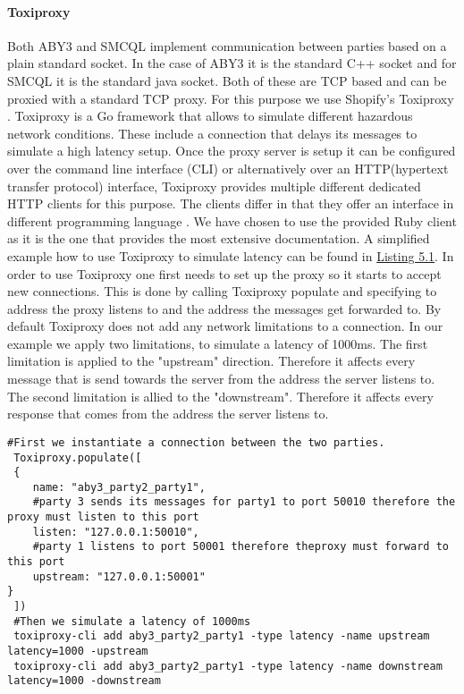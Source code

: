  \paragraph{Toxiproxy}
 Both ABY3 and SMCQL implement communication between parties based on a plain standard socket. In the case of ABY3 it is the standard C++ socket and for SMCQL it is the standard java socket. Both of these are TCP based and can be proxied with a standard TCP proxy. For this purpose we use Shopify's Toxiproxy \cite{toxiproxy}. Toxiproxy is a Go framework that allows to simulate different hazardous network conditions. These include a connection that delays its messages to simulate a high latency setup. Once the proxy server is setup it can be configured over the command line interface (CLI) or alternatively over an HTTP(hypertext transfer protocol) interface, Toxiproxy provides multiple different dedicated HTTP clients for this purpose. The clients differ in that they offer an interface in different programming language . We have chosen to use the provided Ruby client as it is the one that provides the most extensive documentation. 
 A simplified example how to use Toxiproxy to simulate latency can be found in \hyperref[the_label]{Listing 5.1}. In order to use Toxiproxy one first needs to set up the proxy so it starts to accept new connections. This is done by calling Toxiproxy populate and specifying to address the proxy listens to and the address the messages get forwarded to.
 By default Toxiproxy does not add any network limitations to a connection. In our example we apply two limitations, to simulate a latency of 1000ms. The first limitation is applied to the "upstream" direction. Therefore it affects every message that is send towards the server from the address the server listens to. The second limitation is allied to the "downstream". Therefore it affects every response that comes from the address the server listens to.    
 
 \label{Toxi_label}				
 \begin{lstlisting}[caption={Setting up a proxy that simulates latency between two parties with Toxiporxy}]
 #First we instantiate a connection between the two parties. 
 Toxiproxy.populate([
 {
 	name: "aby3_party2_party1",
 	#party 3 sends its messages for party1 to port 50010 therefore the proxy must listen to this port
 	listen: "127.0.0.1:50010",   
 	#party 1 listens to port 50001 therefore theproxy must forward to this port
 	upstream: "127.0.0.1:50001"  
}
 ])
 #Then we simulate a latency of 1000ms 
 toxiproxy-cli add aby3_party2_party1 -type latency -name upstream latency=1000 -upstream
 toxiproxy-cli add aby3_party2_party1 -type latency -name downstream latency=1000 -downstream
 
 \end{lstlisting}
